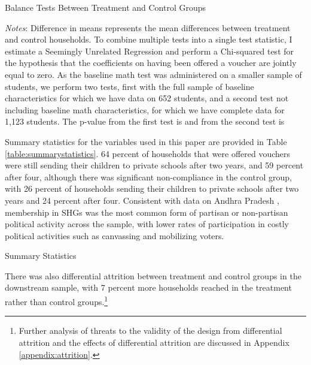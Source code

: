\documentclass[hidelinks, 12pt, titlepage]{article}
\begin{document}
	\begin{table}
		\begin{threeparttable}
			\caption{Balance Tests Between Treatment and Control Groups\label{table:balance}}
			\centering
			
			\begin{tablenotes}
				\item \emph{Notes}: Difference in means represents the mean differences between treatment and control households.  To combine multiple tests into a single test statistic, I estimate a Seemingly Unrelated Regression and perform a Chi-squared test for the hypothesis that the coefficients on having been offered a voucher are jointly equal to zero.  As the baseline math test was administered on a smaller sample of students, we perform two tests, first with the full sample of baseline characteristics for which we have data on 652 students, and a second test not including baseline math characteristics, for which we have complete data for 1,123 students.  The p-value from the first test is  and from the second test is 
			\end{tablenotes}
		\end{threeparttable}
	\end{table}

	Summary statistics for the variables used in this paper are provided in Table \ref{table:summarystatistics}.  64 percent of households that were offered vouchers were still sending their children to private schools after two years, and 59 percent after four, although there was significant non-compliance in the control group, with 26 percent of households sending their children to private schools after two years and 24 percent after four.  Consistent with data on Andhra Pradesh \citep{Deininger2012}, membership in SHGs was the most common form of partisan or non-partisan political activity across the sample, with lower rates of participation in costly political activities such as canvassing and mobilizing voters.

	\begin{table}
		\tiny
		\caption{Summary Statistics\label{table:summarystatistics}}
		
	\end{table}

	There was also differential attrition between treatment and control groups in the downstream sample, with 7 percent more households reached in the treatment rather than control groups.\footnote{Further analysis of threats to the validity of the design from differential attrition and the effects of differential attrition are discussed in Appendix \ref{appendix:attrition}.}
\end{document}
